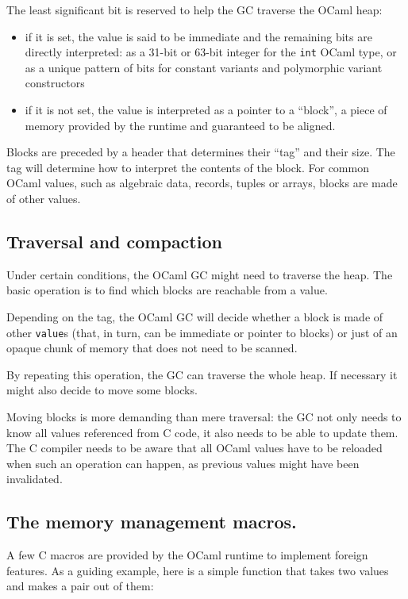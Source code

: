 \documentclass[a4paper]{easychair}
\begin{document}
The least significant bit is reserved to help the GC traverse the OCaml
heap:

\begin{itemize}
\item if it is set, the value is said to be immediate and the remaining bits
      are directly interpreted: as a 31-bit or 63-bit integer for the
      \texttt{int} OCaml type, or as a unique pattern of bits for constant
      variants and polymorphic variant constructors
\item if it is not set, the value is interpreted as a pointer to a
      ``block'', a piece of memory provided by the runtime and guaranteed to
      be aligned.
\end{itemize}

Blocks are preceded by a header that determines their ``tag'' and their
size. The tag will determine how to interpret the contents of the block.
For common OCaml values, such as algebraic data, records, tuples or
arrays, blocks are made of other values.

\subsection{Traversal and compaction}

Under certain conditions, the OCaml GC might need to traverse the heap.
The basic operation is to find which blocks are reachable from a value.

Depending on the tag, the OCaml GC will decide whether a block is made
of other \texttt{value}s (that, in turn, can be immediate or pointer to
blocks) or just of an opaque chunk of memory that does not need to be
scanned.

By repeating this operation, the GC can traverse the whole heap. If
necessary it might also decide to move some blocks.

Moving blocks is more demanding than mere traversal: the GC not only
needs to know all values referenced from C code, it also needs to be
able to update them. The C compiler needs to be aware that all OCaml
values have to be reloaded when such an operation can happen, as
previous values might have been invalidated.

\subsection{The memory management macros.}

A few C macros are provided by the OCaml runtime to implement foreign
features. As a guiding example, here is a simple function that takes two
values and makes a pair out of them:
\end{document}
